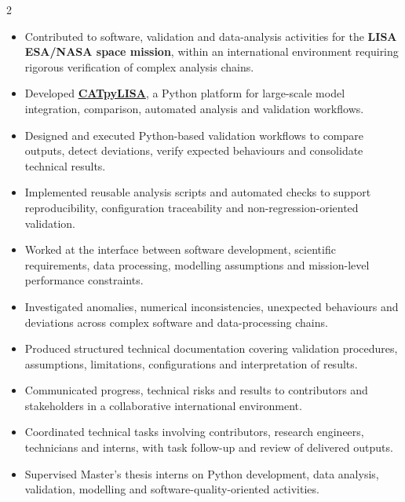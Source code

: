 \documentclass[8pt,a4paper,ragged2e,withhyper]{altacv}
\begin{document}
\begin{paracol}{2}

\begin{itemize}
\item Contributed to software, validation and data-analysis activities for the \textbf{LISA ESA/NASA space mission}, within an international environment requiring rigorous verification of complex analysis chains.
\item Developed \textcolor{DarkPastelRed}{\href{https://gitlab.oca.eu/gboileau/lisa_l3_tools}{\bf CATpyLISA}}, a Python platform for large-scale model integration, comparison, automated analysis and validation workflows.
\item Designed and executed Python-based validation workflows to compare outputs, detect deviations, verify expected behaviours and consolidate technical results.
\item Implemented reusable analysis scripts and automated checks to support reproducibility, configuration traceability and non-regression-oriented validation.
\item Worked at the interface between software development, scientific requirements, data processing, modelling assumptions and mission-level performance constraints.
\item Investigated anomalies, numerical inconsistencies, unexpected behaviours and deviations across complex software and data-processing chains.
\item Produced structured technical documentation covering validation procedures, assumptions, limitations, configurations and interpretation of results.
\item Communicated progress, technical risks and results to contributors and stakeholders in a collaborative international environment.
\item Coordinated technical tasks involving contributors, research engineers, technicians and interns, with task follow-up and review of delivered outputs.
\item Supervised Master's thesis interns on Python development, data analysis, validation, modelling and software-quality-oriented activities.
\end{itemize}

\divider



\end{paracol}
\end{document}
